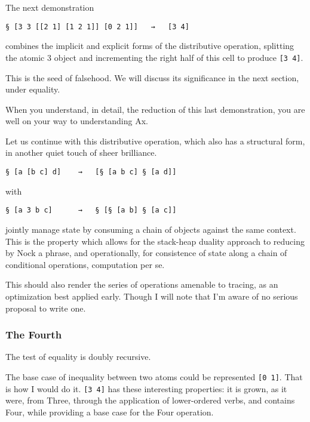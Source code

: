 \documentclass[twoside]{article}
\begin{document}
The next demonstration

\begin{lstlisting}[style=listingcode]
§ [3 3 [[2 1] [1 2 1]] [0 2 1]]   →   [3 4]
\end{lstlisting}

\noindent
combines the implicit and explicit forms of the distributive operation, splitting the atomic 3 object and incrementing the right half of this cell to produce \lstinline[style=inlinecode]{[3 4]}.

This is the seed of falsehood.  We will discuss its significance in the next section, under equality.

When you understand, in detail, the reduction of this last demonstration, you are well on your way to understanding Ax.

Let us continue with this distributive operation, which also has a structural form, in another quiet touch of sheer brilliance.

\begin{lstlisting}[style=listingcode]
§ [a [b c] d]    →   [§ [a b c] § [a d]]
\end{lstlisting}

with

\begin{lstlisting}[style=listingcode]
§ [a 3 b c]      →   § [§ [a b] § [a c]]
\end{lstlisting}

\noindent
jointly manage state by consuming a chain of objects against the same context. This is the property which allows for the stack-heap duality approach to reducing by Nock a phrase, and operationally, for consistence of state along a chain of conditional operations, computation per se.

This should also render the series of operations amenable to tracing, as an optimization best applied early. Though I will note that I'm aware of no serious proposal to write one.

\subsubsection{The Fourth}

The test of equality is doubly recursive.

The base case of inequality between two atoms could be represented \lstinline[style=inlinecode]{[0 1]}.  That is how I would do it.  \lstinline[style=inlinecode]{[3 4]} has these interesting properties: it is grown, as it were, from Three, through the application of lower-ordered verbs, and contains Four, while providing a base case for the Four operation.
\end{document}

